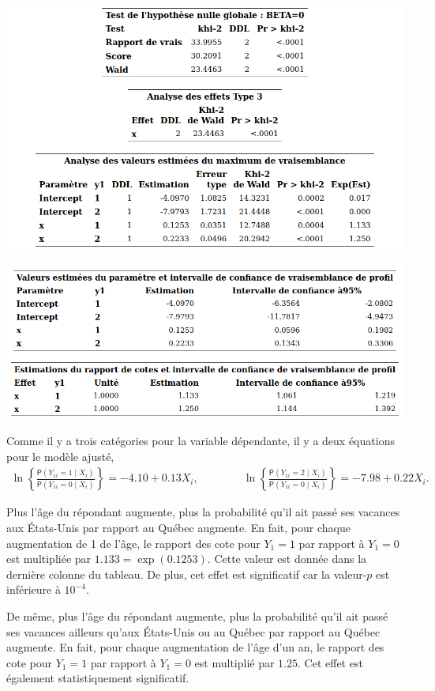 \documentclass[
  11pt,
  letterpaper,
]{book}
\theoremstyle{definition}
\theoremstyle{definition}
\theoremstyle{definition}
\theoremstyle{definition}
\theoremstyle{remark}
\begin{document}
\begin{center}\includegraphics[width=0.8\linewidth]{figures/03-logistic-e24} \end{center}

\begin{center}\includegraphics[width=0.82\linewidth]{figures/03-logistic-e25} \end{center}

Comme il y a trois catégories pour la variable dépendante, il y a deux équations pour le modèle ajusté,
\begin{align*}
\ln \left\{\frac{{\mathsf P}\left(Y_{1i}=1 \mid X_i\right)}{{\mathsf P}\left(Y_{1i}=0 \mid X_i\right)} \right\} = -4.10 + 0.13X_i, \qquad \qquad \ln \left\{\frac{{\mathsf P}\left(Y_{1i}=2 \mid X_i\right)}{{\mathsf P}\left(Y_{1i}=0 \mid X_i\right)} \right\} = -7.98+0.22X_i. 
\end{align*}

Plus l'âge du répondant augmente, plus la probabilité qu'il ait passé ses vacances aux États-Unis par rapport au Québec augmente. En fait, pour chaque augmentation de 1 de l'âge, le rapport des cote pour \(Y_1=1\) par rapport à \(Y_1=0\) est multipliée par \({1.133}=\exp({0.1253})\). Cette valeur est donnée dans la dernière colonne du tableau. De plus, cet effet est significatif car la valeur-\(p\) est inférieure à \(10^{-4}\).

De même, plus l'âge du répondant augmente, plus la probabilité qu'il ait passé ses vacances ailleurs qu'aux États-Unis ou au Québec par rapport au Québec augmente. En fait, pour chaque augmentation de l'âge d'un an, le rapport des cote pour \(Y_1=1\) par rapport à \(Y_1=0\) est multiplié par \({1.25}\). Cet effet est également statistiquement significatif.
\end{document}
